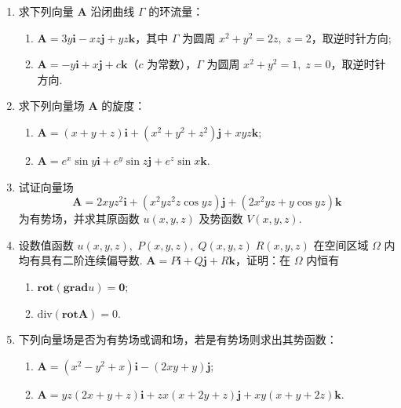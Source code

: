 \begin{enumerate}
    \item 求下列向量 $\boldsymbol{A}$ 沿闭曲线 $\Gamma$ 的环流量：
    \begin{enumerate}[(1)]\setlength{\itemsep}{5pt}\setlength{\topsep}{15pt}
        \item $\boldsymbol{A}=3y\boldsymbol{i}-xz\boldsymbol{j}+yz\boldsymbol{k}$，其中 $\Gamma$ 为圆周 $x^2+y^2=2z,\;z=2$，取逆时针方向;
        \item $\boldsymbol{A}=-y\boldsymbol{i}+x\boldsymbol{j}+c\boldsymbol{k}$（$c$ 为常数），$\Gamma$ 为圆周 $x^2+y^2=1,\;z=0$，取逆时针方向.
    \end{enumerate}

    \item 求下列向量场 $\boldsymbol{A}$ 的旋度：
    \begin{enumerate}[(1)]\setlength{\itemsep}{5pt}\setlength{\topsep}{15pt}
        \item $\boldsymbol{A}=(x+y+z)\boldsymbol{i}+(x^2+y^2+z^2)\boldsymbol{j}+xyz\boldsymbol{k}$;
        \item $\boldsymbol{A}=e^{x}\sin y\boldsymbol{i}+e^{y}\sin z\boldsymbol{j}+e^{z}\sin x\boldsymbol{k}$.
    \end{enumerate}

    \item 试证向量场
    \[
        \boldsymbol{A}=2xyz^2\boldsymbol{i}+(x^2yz^2z\cos yz)\boldsymbol{j}+(2x^2yz+y\cos yz)\boldsymbol{k}
    \]
    为有势场，并求其原函数 $u(x, y, z)$ 及势函数 $V(x, y, z)$.

    \item 设数值函数 $u(x, y, z),\;P(x, y, z),\;Q(x, y, z)\;R(x, y, z)$ 在空间区域 $\Omega$ 内均有具有二阶连续偏导数. $\boldsymbol{A}=P\boldsymbol{i}+Q\boldsymbol{j}+R\boldsymbol{k}$，证明：在 $\Omega$ 内恒有
    \begin{enumerate}[(1)]\setlength{\itemsep}{5pt}\setlength{\topsep}{15pt}
        \item $\boldsymbol{rot}(\boldsymbol{grad} u)=\boldsymbol{0}$;
        \item $\text{div}(\boldsymbol{rot} \boldsymbol{A})=0$.
    \end{enumerate}

    \item 下列向量场是否为有势场或调和场，若是有势场则求出其势函数：
    \begin{enumerate}[(1)]\setlength{\itemsep}{5pt}\setlength{\topsep}{15pt}
        \item $\boldsymbol{A}=(x^2-y^2+x)\boldsymbol{i}-(2xy+y)\boldsymbol{j}$;
        \item $\boldsymbol{A}=yz(2x+y+z)\boldsymbol{i}+zx(x+2y+z)\boldsymbol{j}+xy(x+y+2z)\boldsymbol{k}$.
    \end{enumerate}


\end{enumerate}
